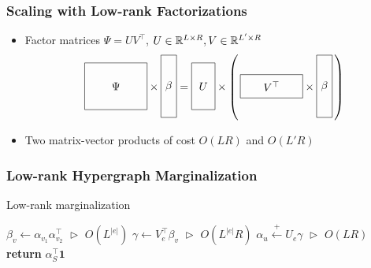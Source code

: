 \documentclass{beamer}
\begin{document}
\begin{frame}
\frametitle{Scaling with Low-rank Factorizations}
\begin{itemize}
\item Factor matrices $\Psi=UV^\top$,
$U\in\mathbb{R}^{L \times R},V\in\mathbb{R}^{L'\times R}$
\[
\vcenter{\hbox{\begin{tikzpicture}[baseline=-0.5ex]
    \draw (0,0) rectangle (2,1.5) node[pos=.5] {$\Psi$};
\end{tikzpicture}}}
\times
\vcenter{\hbox{\begin{tikzpicture}[baseline=-0.5ex]
    \draw (0,0) rectangle (.5,2) node[pos=.5] {$\beta$};
\end{tikzpicture}}}
=
\vcenter{\hbox{\begin{tikzpicture}[baseline=-0.5ex]
    \draw (0,0) rectangle (.75,1.5) node[pos=.5] {$U$};
\end{tikzpicture}}}
\times
\left(\,
\vcenter{\hbox{\begin{tikzpicture}[baseline=-0.5ex]
    \draw (0,0) rectangle (2,.75) node[pos=.5] {$V^\top$};
\end{tikzpicture}}}
\times
\vcenter{\hbox{\begin{tikzpicture}[baseline=-0.5ex]
    \draw (0,0) rectangle (.5,2) node[pos=.5] {$\beta$};
\end{tikzpicture}}}
\,\right)
\]
\item Two matrix-vector products of cost $O(LR)$ and $O(L'R)$
\end{itemize}
\end{frame}

\begin{frame}
\frametitle{Low-rank Hypergraph Marginalization}
\centering

\begin{algorithm}[H]
\caption{\label{alg:low-rank-update} Low-rank marginalization}
\begin{algorithmic} 
\STATE $\beta_v \gets \alpha_{v_1}\alpha_{v_2}^\top$
    \hfill $\vartriangleright$ $O(L^{|e|})$
\STATE $\gamma \gets V_e^\top\beta_v$
    \hfill $\vartriangleright$ $O(L^{|e|}R)$
\STATE $\alpha_u \stackrel{+}{\gets} U_e\gamma $
    \hfill $\vartriangleright$ $O(LR)$
\ENDFOR
\STATE \textbf{return} $\alpha_S^\top\mathbf{1}$
\end{algorithmic} 
\end{algorithm}

\end{frame}
\end{document}
